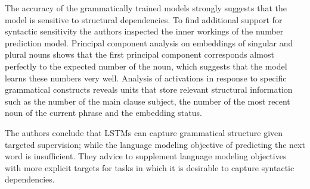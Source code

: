 The accuracy of the grammatically trained models strongly suggests
that the model is sensitive to structural dependencies. To
find additional support for syntactic sensitivity the authors
inspected the inner workings of the number prediction model.
Principal component analysis on embeddings of singular and plural nouns
shows that the first principal component
corresponds almost perfectly to the expected number of the noun,
which suggests that the model learns these numbers very well.
Analysis of activations in response to specific grammatical
constructs reveals units that store relevant structural
information such as the number of the main clause subject,
the number of the most recent noun of the current phrase
and the embedding status. 


The authors conclude that LSTMs can capture grammatical structure given targeted supervision; while the language modeling objective of predicting the next word is insufficient. They advice to supplement language modeling objectives with more explicit targets for tasks in which it is desirable to capture syntactic dependencies.
